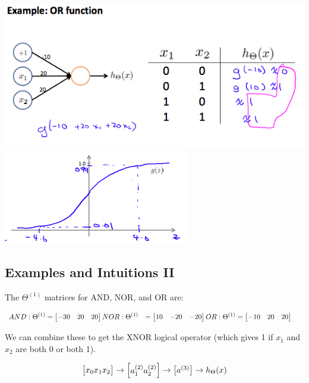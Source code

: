 \documentclass[
]{book}
\begin{document}
\includegraphics{NN_example_OR.png}
\includegraphics{NN_example_2.png}

\hypertarget{examples-and-intuitions-ii}{%
\subsection{Examples and Intuitions II}\label{examples-and-intuitions-ii}}

The \(Θ^{(1)}\) matrices for AND, NOR, and OR are:

\begin{align}AND:\newline\Theta^{(1)} &=\begin{bmatrix}-30 & 20 & 20\end{bmatrix} \newline NOR:\newline\Theta^{(1)} &= \begin{bmatrix}10 & -20 & -20\end{bmatrix} \newline OR:\newline\Theta^{(1)} &= \begin{bmatrix}-10 & 20 & 20\end{bmatrix} \newline\end{align}

We can combine these to get the XNOR logical operator (which gives 1 if \(x_1\) and \(x_2\) are both 0 or both 1).

\begin{align}\begin{bmatrix}x_0 \newline x_1 \newline x_2\end{bmatrix} \rightarrow\begin{bmatrix}a_1^{(2)} \newline a_2^{(2)} \end{bmatrix} \rightarrow\begin{bmatrix}a^{(3)}\end{bmatrix} \rightarrow h_\Theta(x)\end{align}
\end{document}
